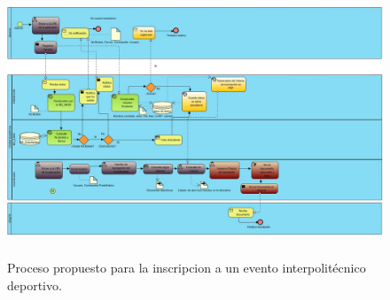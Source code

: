 		\begin{figure}[hbt!]
			\centering
			\includegraphics[width=16cm, height=8cm]{Imagenes/Disenos/ProcesoInscripcionPropuesto.jpg}
			\caption{Proceso propuesto para la inscripcion a un evento interpolitécnico deportivo.}
			\label{ProcesoInscripcionPropuesto}
		\end{figure}
	
	
